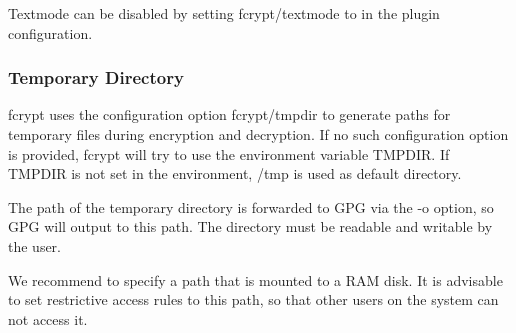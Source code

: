 Textmode can be disabled by setting {\ttfamily fcrypt/textmode} to {} in the plugin configuration.

\subsubsection*{Temporary Directory}

{\ttfamily fcrypt} uses the configuration option {\ttfamily fcrypt/tmpdir} to generate paths for temporary files during encryption and decryption. If no such configuration option is provided, {\ttfamily fcrypt} will try to use the environment variable {\ttfamily T\+M\+P\+D\+IR}. If {\ttfamily T\+M\+P\+D\+IR} is not set in the environment, {\ttfamily /tmp} is used as default directory.

The path of the temporary directory is forwarded to G\+PG via the {\ttfamily -\/o} option, so G\+PG will output to this path. The directory must be readable and writable by the user.

We recommend to specify a path that is mounted to a R\+AM disk. It is advisable to set restrictive access rules to this path, so that other users on the system can not access it. 